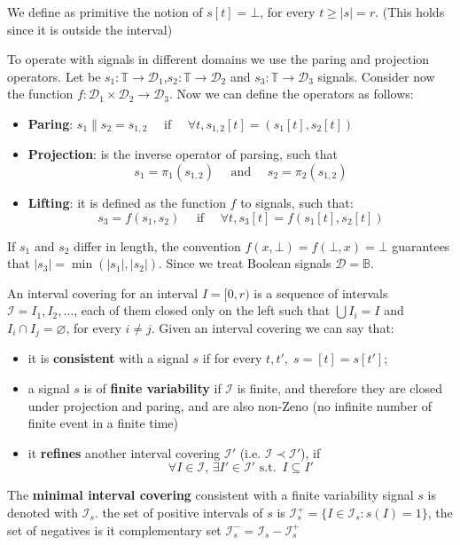 \documentclass{suftesi}
\renewcommand{\b}{\textbf}
\newcommand{\abs}[1]{\lvert #1 \rvert}
\begin{document}
We define as primitive the notion of $s[t]=\bot$, for every $t\geq\abs{s}=r$. (This holds since it is outside the interval)

To operate with signals in different domains we use the paring and projection operators. Let be $s_1:\mathbb{T}\to\mathcal{D}_1$,$s_2:\mathbb{T}\to\mathcal{D}_2$ and $s_3:\mathbb{T}\to\mathcal{D}_3$ signals. Consider now the function $f:\mathcal{D}_1\times\mathcal{D}_2\to \mathcal{D}_3$. Now we can define the operators as follows:
\begin{itemize}[leftmargin=0.5cm]
    \item \b{Paring}: $s_1\|s_2=s_{1,2}\quad \text{ if }\quad\forall t, s_{1,2}[t]=(s_1[t],s_2[t])$
    \item \b{Projection}: is the inverse operator of parsing, such that $$s_1=\pi_1(s_{1,2}) \quad \text{ and } \quad s_2=\pi_2(s_{1,2})$$
    \item \b{Lifting}: it is defined as the function $f$ to signals, such that: $$s_3=f(s_1,s_2) \quad \text{ if }\quad \forall t, s_3[t]= f(s_1[t],s_2[t])$$
\end{itemize}

If $s_1$ and $s_2$ differ in length, the convention $f(x,\bot)=f(\bot, x)=\bot$ guarantees that $\abs{s_3}=\min(\abs{s_1},\abs{s_2})$. Since we treat Boolean signals $\mathcal{D}=\mathbb{B}$. 

An interval covering for an interval $I=[0,r)$ is a sequence of intervals $\mathcal{I}=I_1,I_2,\dots$, each of them closed only on the left such that $\bigcup I_i=I$ and $I_i\cap I_j=\varnothing$, for every $i\neq j$. Given an interval covering we can say that:
\begin{itemize}[leftmargin=0.5cm]
    \item it is \b{consistent} with a signal $s$ if for every $t,t',\; s=[t]=s[t']$;
    \item a signal $s$ is of \b{finite variability} if $\mathcal{I}$ is finite, and therefore they are closed under projection and paring, and are also non-Zeno (no infinite number of finite event in a finite time)
    \item it \b{refines} another interval covering $\mathcal{I}'$ (i.e. $\mathcal{I}\prec\mathcal{I}'$), if $$\forall I \in \mathcal{I},\, \exists I' \in \mathcal{I}'\text{ s.t. } \,I\subseteq I'$$
\end{itemize} 

The \b{minimal interval covering} consistent with a finite  variability signal $s$ is denoted with $\mathcal{I}_s$. the set of positive intervals of $s$ is $\mathcal{I}^+_s=\{I\in \mathcal{I}_s : s(I)=1\}$, the set of negatives is it complementary set $\mathcal{I}^-_s=\mathcal{I}_s-\mathcal{I}^+_s$
\end{document}
